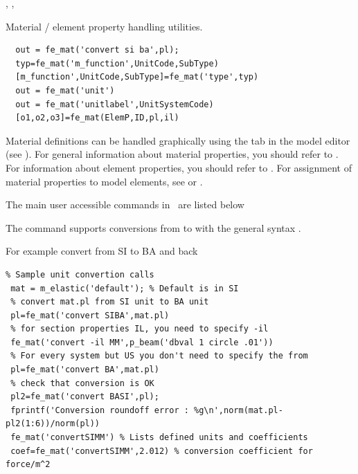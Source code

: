 
\noindent \fec, \fecase, \femk




\noindent Material / element property handling utilities.

\rsyntax\begin{verbatim}
  out = fe_mat('convert si ba',pl);
  typ=fe_mat('m_function',UnitCode,SubType)
  [m_function',UnitCode,SubType]=fe_mat('type',typ)
  out = fe_mat('unit')
  out = fe_mat('unitlabel',UnitSystemCode)
  [o1,o2,o3]=fe_mat(ElemP,ID,pl,il)
\end{verbatim}


Material definitions can be handled graphically using the  tab in the model editor (see ). For general information about material properties, you should refer to . For information about element properties, you should refer to . For assignment of material properties to model elements, see   or .

The main user accessible commands in \femat\ are listed below


The  command supports conversions from  to  with the general syntax . 

For example convert from SI to BA and back
\begin{verbatim}
% Sample unit convertion calls
 mat = m_elastic('default'); % Default is in SI
 % convert mat.pl from SI unit to BA unit
 pl=fe_mat('convert SIBA',mat.pl)
 % for section properties IL, you need to specify -il
 fe_mat('convert -il MM',p_beam('dbval 1 circle .01'))
 % For every system but US you don't need to specify the from
 pl=fe_mat('convert BA',mat.pl)
 % check that conversion is OK
 pl2=fe_mat('convert BASI',pl);
 fprintf('Conversion roundoff error : %g\n',norm(mat.pl-pl2(1:6))/norm(pl))
 fe_mat('convertSIMM') % Lists defined units and coefficients
 coef=fe_mat('convertSIMM',2.012) % conversion coefficient for force/m^2
\end{verbatim}%


